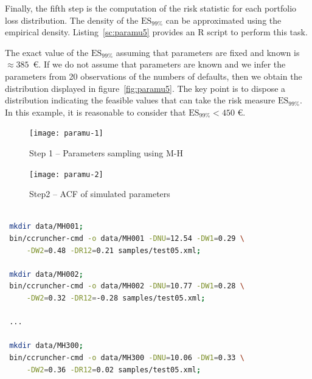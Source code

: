 \documentclass[11pt,fleqn]{book} %
\begin{document}
\begin{example}
	Finally, the fifth step is the computation of the risk statistic
	for each portfolio loss distribution. The density of the $\text{ES}_{99\%}$ 
	can be approximated using the empirical density. Listing~\ref{sc:paramu5}
	provides an R script to perform this task. 

	The exact value of the $\text{ES}_{99\%}$ assuming that parameters 
	are fixed and known is $\approx 385$\ \euro. If we do not assume that 
	parameters are known and we infer the parameters from 20 observations 
	of the numbers of defaults, then we obtain the distribution displayed 
	in figure~\ref{fig:paramu5}. 
	The key point is to dispose a distribution indicating the 
	feasible values that can take the risk measure $\text{ES}_{99\%}$.
	In this example, it is reasonable to consider that 
	$\text{ES}_{99\%} < 450$ \euro.
\end{example}

\begin{figure}[!ht]
	\centering
	\texttt{[image: paramu-1]}
	\caption{Step 1 -- Parameters sampling using M-H}
	\label{fig:paramu1}
\end{figure}

\begin{figure}[ht]
	\centering
	\texttt{[image: paramu-2]}
	\caption{Step2 -- ACF of simulated parameters}
	\label{fig:paramu2}
\end{figure}

\begin{lstlisting}[language=bash, label={sc:paramu4}, caption={Execution of multiple CCrunchers (bash script)}]
 
 mkdir data/MH001;
 bin/ccruncher-cmd -o data/MH001 -DNU=12.54 -DW1=0.29 \
     -DW2=0.48 -DR12=0.21 samples/test05.xml; 
 
 mkdir data/MH002; 
 bin/ccruncher-cmd -o data/MH002 -DNU=10.77 -DW1=0.28 \
     -DW2=0.32 -DR12=-0.28 samples/test05.xml; 

 ...

 mkdir data/MH300; 
 bin/ccruncher-cmd -o data/MH300 -DNU=10.06 -DW1=0.33 \
     -DW2=0.36 -DR12=0.02 samples/test05.xml; 
 
\end{lstlisting}
\end{document}
